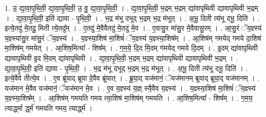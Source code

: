 \documentclass[17pt]{extarticle}
\begin{document}
1. उ॒ द्या॒वा॒पृ॒थि॒वी॒ द्या॒वा॒पृ॒थि॒वी॒ उ॒ वु॒ द्या॒वा॒पृ॒थि॒वी॒ । . द्या॒वा॒पृ॒थि॒वी॒ भ॒द्रम् भ॒द्रम् द्या॑वापृथिवी द्यावापृथिवी भ॒द्रम् । . द्या॒वा॒पृ॒थि॒वी॒ इति॑ द्यावा - पृ॒थि॒वी॒ । . भ॒द्र म॑भू दभूद् भ॒द्रम् भ॒द्र म॑भूत् । . अ॒भू॒ दिती त्य॑भू दभू॒ दिति॑ । . इत्ये॒तदु॑ मे॒तदु॒ मिती त्ये॒तदु᳚म् । . ए॒तदु॑ मे॒वैवैतदु॑ मे॒तदु॑ मे॒व । . ए॒वासु॒र मा॑सु॒र मे॒वैवासु॒रम् । . आ॒सु॒रं ॅय॒ज्ञ्स्य॑ य॒ज्ञ्स्या॑सु॒र मा॑सु॒रं ॅय॒ज्ञ्स्य॑ । . य॒ज्ञ्स्या॒शिष॑ मा॒शिषं॑ ॅय॒ज्ञ्स्य॑ य॒ज्ञ्स्या॒शिष᳚म् । . आ॒शिष॑म् गमयेद् गमये दा॒शिष॑ मा॒शिष॑म् गमयेत् । . आ॒शिष॒मित्या᳚ - शिष᳚म् । . ग॒म॒ये॒ दि॒द मि॒दम् ग॑मयेद् गमये दि॒दम् । . इ॒दम् द्या॑वापृथिवी द्यावापृथिवी इ॒द मि॒दम् द्या॑वापृथिवी । . द्या॒वा॒पृ॒थि॒वी॒ भ॒द्रम् भ॒द्रम् द्या॑वापृथिवी द्यावापृथिवी भ॒द्रम् । . द्या॒वा॒पृ॒थि॒वी॒ इति॑ द्यावा - पृ॒थि॒वी॒ । . भ॒द्र म॑भू दभूद् भ॒द्रम् भ॒द्र म॑भूत् । . अ॒भू॒ दिती त्य॑भू दभू॒ दिति॑ । . इत्ये॒वैवे तीत्ये॒व । . ए॒व ब्रू॑याद् ब्रूया दे॒वैव ब्रू॑यात् । . ब्रू॒या॒द् यज॑मानं॒ ॅयज॑मानम् ब्रूयाद् ब्रूया॒द् यज॑मानम् । . यज॑मान मे॒वैव यज॑मानं॒ ॅयज॑मान मे॒व । . ए॒व य॒ज्ञ्स्य॑ य॒ज्ञ् स्यै॒वैव य॒ज्ञ्स्य॑ । . य॒ज्ञ्स्या॒शिष॑ मा॒शिषं॑ ॅय॒ज्ञ्स्य॑ य॒ज्ञ्स्या॒शिष᳚म् । . आ॒शिष॑म् गमयति गमय त्या॒शिष॑ मा॒शिष॑म् गमयति । . आ॒शिष॒मित्या᳚ - शिष᳚म् । . ग॒म॒य॒ त्यार्द्ध्मा र्द्ध्म॑ गमयति गमय॒ त्यार्द्ध्म॑ । \newline
\end{document}
